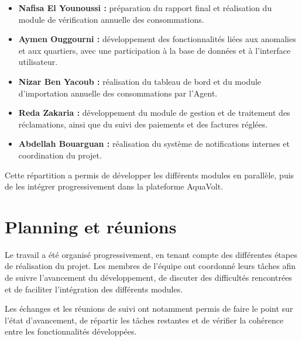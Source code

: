 \begin{itemize}[leftmargin=*]
    \item \textbf{Nafisa El Younoussi :} préparation du rapport final et réalisation du module de vérification annuelle des consommations.
    \item \textbf{Aymen Ouggourni :} développement des fonctionnalités liées aux anomalies et aux quartiers, avec une participation à la base de données et à l'interface utilisateur.
    \item \textbf{Nizar Ben Yacoub :} réalisation du tableau de bord et du module d'importation annuelle des consommations par l'Agent.
    \item \textbf{Reda Zakaria :} développement du module de gestion et de traitement des réclamations, ainsi que du suivi des paiements et des factures réglées.
    \item \textbf{Abdellah Bouarguan :} réalisation du système de notifications internes et coordination du projet.
\end{itemize}

Cette répartition a permis de développer les différents modules en parallèle, puis de les intégrer progressivement dans la plateforme AquaVolt.

\section{Planning et réunions}

Le travail a été organisé progressivement, en tenant compte des différentes étapes de réalisation du projet. Les membres de l'équipe ont coordonné leurs tâches afin de suivre l'avancement du développement, de discuter des difficultés rencontrées et de faciliter l'intégration des différents modules.

Les échanges et les réunions de suivi ont notamment permis de faire le point sur l'état d'avancement, de répartir les tâches restantes et de vérifier la cohérence entre les fonctionnalités développées.
